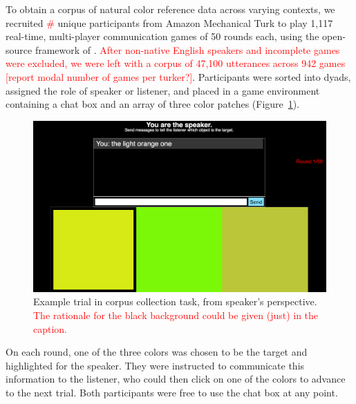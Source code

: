 \documentclass[11pt,letterpaper]{article}
\renewcommand{\|}{\mid}
\newcommand{\figref}[1]{Figure~\ref{#1}}
\newcommand{\todocheck}[1]{\textcolor{red}{#1}}
\begin{document}
To obtain a corpus of natural color reference data across varying
contexts, we recruited \todocheck{\#} unique participants from Amazon
Mechanical Turk to play 1,117 real-time, multi-player communication
games of 50 rounds each, using the open-source framework of
.  \todocheck{After non-native
  English speakers and incomplete games were excluded, we were left
  with a corpus of 47,100 utterances across 942 games [report modal
  number of games per turker?]}. Participants were sorted into dyads,
assigned the role of speaker or listener, and placed in a game
environment containing a chat box and an array of three color patches
(\figref{fig:taskScreenshot}).

\begin{figure}
\includegraphics[scale = .2]{figures/speakerView.png}
\caption{Example trial in corpus collection task, from speaker's
  perspective. \todocheck{The rationale for the black background could
    be given (just) in the caption.}}
\label{fig:taskScreenshot}
\end{figure}

On each round, one of the three colors was chosen to be the target and
highlighted for the speaker. They were instructed to communicate this
information to the listener, who could then click on one of the colors
to advance to the next trial. Both participants were free to use the
chat box at any point.

\newcommand{\Lex}{\mathcal{L}}
\newcommand{\Costs}{\kappa}
\newcommand{\Messages}{U}
\newcommand{\targetPrior}{P}
\end{document}
